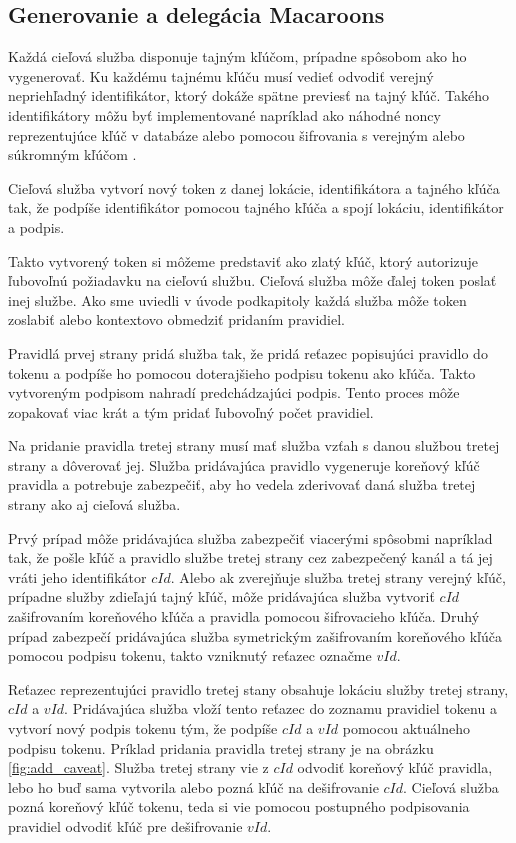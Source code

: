 \subsection{Generovanie a delegácia Macaroons}

Každá cieľová služba disponuje tajným kľúčom, prípadne spôsobom ako ho vygenerovať. Ku každému tajnému kľúču musí vedieť odvodiť verejný nepriehľadný identifikátor, ktorý dokáže spätne previesť na tajný kľúč. Takého identifikátory môžu byť implementované napríklad ako náhodné noncy reprezentujúce kľúč v databáze alebo pomocou šifrovania s verejným alebo súkromným kľúčom \cite{macaroons_key_id}.

Cieľová služba vytvorí nový token z danej lokácie, identifikátora a tajného kľúča tak, že podpíše identifikátor pomocou tajného kľúča a spojí lokáciu, identifikátor a podpis.

Takto vytvorený token si môžeme predstaviť ako zlatý kľúč, ktorý autorizuje ľubovoľnú požiadavku na cieľovú službu. Cieľová služba môže ďalej token poslať inej službe. Ako sme uviedli v úvode podkapitoly každá služba môže token zoslabiť alebo kontextovo obmedziť pridaním pravidiel.

Pravidlá prvej strany pridá služba tak, že pridá reťazec popisujúci pravidlo do tokenu a podpíše ho pomocou doterajšieho podpisu tokenu ako kľúča. Takto vytvoreným podpisom nahradí predchádzajúci podpis. Tento proces môže zopakovať viac krát a tým pridať ľubovoľný počet pravidiel.

Na pridanie pravidla tretej strany musí mať služba vzťah s danou službou tretej strany a dôverovať jej. Služba pridávajúca pravidlo vygeneruje koreňový kľúč pravidla a potrebuje zabezpečiť, aby ho vedela zderivovať daná služba tretej strany ako aj cieľová služba. 

Prvý prípad môže pridávajúca služba zabezpečiť viacerými spôsobmi napríklad tak, že pošle kľúč a pravidlo službe tretej strany cez zabezpečený kanál a tá jej vráti jeho identifikátor $cId$. Alebo ak zverejňuje služba tretej strany verejný kľúč, prípadne služby zdieľajú tajný kľúč, môže pridávajúca služba vytvoriť $cId$ zašifrovaním koreňového kľúča a pravidla pomocou šifrovacieho kľúča. Druhý prípad zabezpečí pridávajúca služba symetrickým zašifrovaním koreňového kľúča pomocou podpisu tokenu, takto vzniknutý reťazec označme $vId$.

Reťazec reprezentujúci pravidlo tretej stany obsahuje lokáciu služby tretej strany, $cId$ a $vId$. Pridávajúca služba vloží tento reťazec do zoznamu pravidiel tokenu a vytvorí nový podpis tokenu tým, že podpíše $cId$ a $vId$ pomocou aktuálneho podpisu tokenu. Príklad pridania pravidla tretej strany je na obrázku \ref{fig:add_caveat}. Služba tretej strany vie z $cId$ odvodiť koreňový kľúč pravidla, lebo ho buď sama vytvorila alebo pozná kľúč na dešifrovanie $cId$. Cieľová služba pozná koreňový kľúč tokenu, teda si vie pomocou postupného podpisovania pravidiel odvodiť kľúč pre dešifrovanie $vId$.

